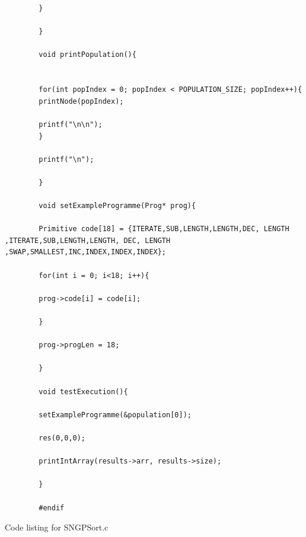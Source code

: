 \documentclass{article}
\begin{document}
\begin{lstlisting}
	    }
	    
	    }
	    
	    void printPopulation(){
	    
	    
	    for(int popIndex = 0; popIndex < POPULATION_SIZE; popIndex++){
	    printNode(popIndex);
	    
	    printf("\n\n");
	    }
	    
	    printf("\n");
	    
	    }
	    
	    void setExampleProgramme(Prog* prog){
	    
	    Primitive code[18] = {ITERATE,SUB,LENGTH,LENGTH,DEC, LENGTH ,ITERATE,SUB,LENGTH,LENGTH,	DEC, LENGTH ,SWAP,SMALLEST,INC,INDEX,INDEX,INDEX};
	    
	    for(int i = 0; i<18; i++){
	    
	    prog->code[i] = code[i];
	    
	    }
	    
	    prog->progLen = 18;
	    
	    }
	    
	    void testExecution(){
	    
	    setExampleProgramme(&population[0]);
	    
	    res(0,0,0);
	    
	    printIntArray(results->arr, results->size);
	    
	    }
	    
	    #endif
	    \end{lstlisting}
	    
	    Code listing for SNGPSort.c
	    
\end{document}
